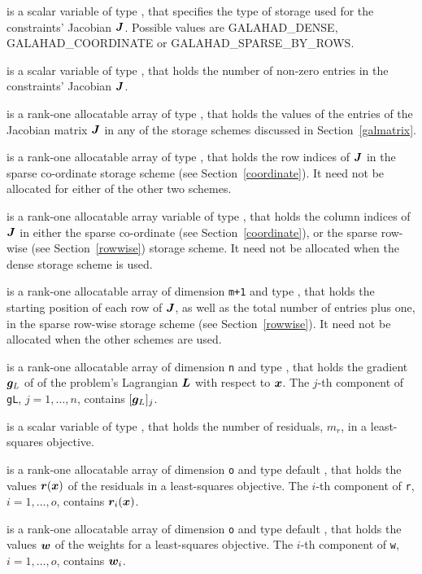 \documentclass{galahad}
\newcommand{\sym}{\sf\small}
\begin{document}
\begin{description}
 is a scalar variable of type \integer, 
that specifies the type of storage used for the 
constraints' Jacobian ${\bm{J}}$.
Possible values are {\sym GALAHAD\_DENSE}, {\sym GALAHAD\_COORDINATE} 
or {\sym GALAHAD\_SPARSE\_BY\_ROWS}.
              
 is a scalar variable of type \integer, 
that holds the number of non-zero entries in the 
constraints' Jacobian ${\bm{J}}$.

 is a rank-one allocatable array of type \realdp, that holds
the values of the entries of the Jacobian matrix ${\bm{J}}$ in any of the 
storage schemes discussed in Section~\ref{galmatrix}.

 is a rank-one allocatable array of type \integer,
that holds the row indices of ${\bm{J}}$ in the sparse co-ordinate storage
scheme (see Section~\ref{coordinate}). 
It need not be allocated for either of the other two schemes.

 is a rank-one allocatable array variable of type \integer,
that holds the column indices of ${\bm{J}}$ in either the sparse co-ordinate 
(see Section~\ref{coordinate}), or the sparse row-wise 
(see Section~\ref{rowwise}) storage scheme.
It need not be allocated when the dense storage scheme is used.

 is a rank-one allocatable array of dimension {\tt m+1} and type 
\integer, that holds the 
starting position of each row of ${\bm{J}}$, as well
as the total number of entries plus one, in the sparse row-wise storage
scheme (see Section~\ref{rowwise}). It need not be allocated when the
other schemes are used.

 is a rank-one allocatable array of dimension {\tt n} and type 
\realdp, that holds the gradient ${\bm{g}}_L$ 
of of the problem's Lagrangian ${\bm{L}}$ with respect to ${\bm{x}}$.
The $j$-th component of 
{\tt gL}, $j = 1,  \ldots ,  n$, contains $[{\bm{g}}_L]_{j}$.

 is a scalar variable of type \integer, 
 that holds the number of residuals, $m_r$, in a least-squares objective.

 is a rank-one allocatable array of dimension {\tt o} and type default 
\realdp, that holds the values ${\bm{r}}({\bm{x}})$ of the residuals in a least-squares
objective. The $i$-th component of {\tt r}, $i = 1,  \ldots ,  o$, contains 
${\bm{r}}_{i}({\bm{x}})$.  

 is a rank-one allocatable array of dimension {\tt o} and type default 
\realdp, that holds the values ${\bm{w}}$ of the weights for a least-squares
objective. The $i$-th component of {\tt w}, $i = 1,  \ldots ,  o$, contains 
${\bm{w}}_{i}$.  


\end{description}
\end{document}
